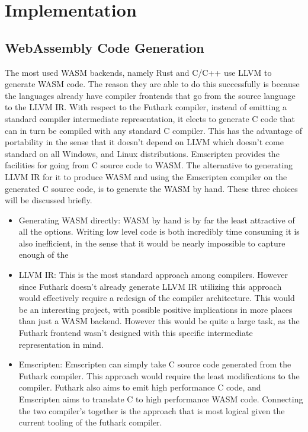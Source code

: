 \documentclass[11pt]{book}
\begin{document}

\chapter{Implementation}

\section{WebAssembly Code Generation}

The most used WASM backends, namely Rust and C/C++ use LLVM to generate WASM code. The reason they are able to do this successfully is because the languages already have compiler frontends that go from the source language to the LLVM IR. With respect to the Futhark compiler, instead of emitting a standard compiler intermediate representation, it elects to generate C code that can in turn be compiled with any standard C compiler. This has the advantage of portability in the sense that it doesn't depend on LLVM which doesn't come standard on all Windows, and Linux distributions. Emscripten provides the facilities for going from C source code to WASM. The alternative to generating LLVM IR for it to produce WASM and using the Emscripten compiler on the generated C source code, is to generate the WASM by hand. These three choices will be discussed briefly.

\begin{itemize}
    \item Generating WASM directly: 
        WASM by hand is by far the least attractive of all the options. Writing low level code is both incredibly time consuming it is also inefficient, in the sense that it would be nearly impossible to capture enough of the  
    \item LLVM IR: This is the most standard approach among compilers. However since Futhark doesn't already generate LLVM IR utilizing this approach would effectively require a redesign of the compiler architecture. This would be an interesting project, with possible positive implications in more places than just a WASM backend. However this would be quite a large task, as the Futhark frontend wasn't designed with this specific intermediate representation in mind. 
    \item Emscripten: Emscripten can simply take C source code generated from the Futhark compiler. This approach would require the least modifications to the compiler. Futhark also aims to emit high performance C code, and Emscripten aims to translate C to high performance WASM code. Connecting the two compiler's together is the approach that is most logical given the current tooling of the futhark compiler.
\end{itemize}
\end{document}
